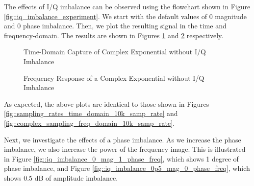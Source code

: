 \documentclass{article}
\begin{document}
The effects of I/Q imbalance can be observed using the flowchart shown in Figure \ref{fig::iq_imbalance_experiment}. We start with the default values of 0 magnitude and 0 phase imbalance. Then, we plot the resulting signal in the time and frequency-domain. The results are shown in Figures \ref{fig::iq_imbalance_0_mag_0_phase_time} and \ref{fig::iq_imbalance_0_mag_0_phase_freq} respectively. 

\begin{figure}[H]
	\centerline{}
	\caption{Time-Domain Capture of Complex Exponential without I/Q Imbalance}
	\label{fig::iq_imbalance_0_mag_0_phase_time}
\end{figure}

\begin{figure}[H]
	\centerline{}
	\caption{Frequency Response of a Complex Exponential without I/Q Imbalance}
	\label{fig::iq_imbalance_0_mag_0_phase_freq}
\end{figure}

As expected, the above plots are identical to those shown in Figures \ref{fig::sampling_rates_time_domain_10k_samp_rate} and  \ref{fig::complex_sampling_freq_domain_10k_samp_rate}.

Next, we investigate the effects of a phase imbalance. As we increase the phase imbalance, we also increase the power of the frequency image. This is illustrated in Figure \ref{fig::iq_imbalance_0_mag_1_phase_freq}, which shows 1 degree of phase imbalance, and Figure \ref{fig::iq_imbalance_0p5_mag_0_phase_freq}, which shows 0.5 dB of amplitude imbalance.
\end{document}
